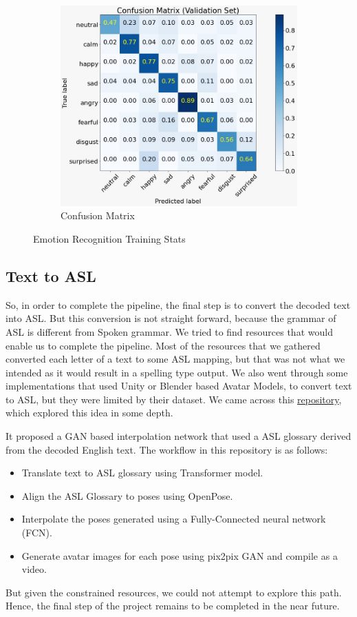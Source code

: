 \documentclass[14pt,a4paper]{article}
\begin{document}
\begin{figure}
\begin{subfigure}[b]{0.3\textwidth}
    \includegraphics[width=\textwidth]{../images/cm.jpeg}
    \caption{Confusion Matrix}
    \end{subfigure}
    \label{fig:Emotion Recognition}
    \caption{Emotion Recognition Training Stats}
\end{figure}

\subsection{Text to ASL}
So, in order to complete the pipeline, the final step is to convert the decoded text into ASL. But this conversion is not straight forward, because the grammar of ASL is different from Spoken grammar. We tried to find resources that would enable us to complete the pipeline. Most of the resources that we gathered converted each letter of a text to some ASL mapping, but that was not what we intended as it would result in a spelling type output. We also went through some implementations that used Unity or Blender based Avatar Models, to convert text to ASL, but they were limited by their dataset. We came across this \href{https://github.com/arunnair411/Speech-to-ASL}{repository}, which explored this idea in some depth.

It proposed a GAN based interpolation network that used a ASL glossary derived from the decoded English text. The workflow in this repository is as follows:
\begin{itemize}
	\item Translate text to ASL glossary using Transformer model.
	\item Align the ASL Glossary to poses using OpenPose.
	\item Interpolate the poses generated using a Fully-Connected neural network (FCN).
	\item Generate avatar images for each pose using pix2pix GAN and compile as a video.
\end{itemize}
But given the constrained resources, we could not attempt to explore this path. Hence, the final step of the project remains to be completed in the near future.
\end{document}
